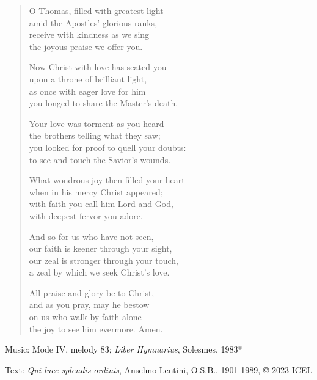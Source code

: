 \hymn

\begin{verse}
O Thomas, filled with greatest light\\
amid the Apostles’ glorious ranks,\\
receive with kindness as we sing\\
the joyous praise we offer you.

Now Christ with love has seated you\\
upon a throne of brilliant light,\\
as once with eager love for him\\
you longed to share the Master’s death.

Your love was torment as you heard\\
the brothers telling what they saw;\\
you looked for proof to quell your doubts:\\
to see and touch the Savior’s wounds.

What wondrous joy then filled your heart\\
when in his mercy Christ appeared;\\
with faith you call him Lord and God,\\
with deepest fervor you adore.

And so for us who have not seen,\\
our faith is keener through your sight,\\
our zeal is stronger through your touch,\\
a zeal by which we seek Christ’s love.

All praise and glory be to Christ,\\
and as you pray, may he bestow\\
on us who walk by faith alone\\
the joy to see him evermore. Amen.
\end{verse}

\begin{hymnsource}
Music: Mode IV, melody 83; \emph{Liber Hymnarius}, Solesmes, 1983*

Text: \emph{Qui luce splendis ordinis}, Anselmo Lentini, O.S.B., 1901-1989, © 2023 ICEL
\end{hymnsource}
